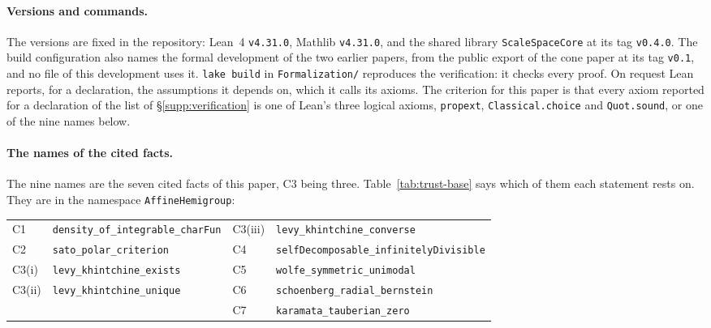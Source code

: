 \paragraph{Versions and commands.} The versions are fixed in the repository: Lean~4
\texttt{v4.31.0}, Mathlib \texttt{v4.31.0}, and the shared library \texttt{ScaleSpaceCore} at its
tag \texttt{v0.4.0}. The build configuration also names the formal development of the two earlier
papers, from the public export of the cone paper at its tag \texttt{v0.1}, and no file of this
development uses it. \texttt{lake build} in \texttt{Formalization/} reproduces the verification:
it checks every proof. On request Lean reports, for a declaration, the assumptions it depends on,
which it calls its axioms. The criterion for this paper is that every axiom reported for a
declaration of the list of \S\ref{supp:verification} is one of Lean's three logical axioms,
\texttt{propext},
\texttt{Classical.choice} and \texttt{Quot.sound}, or one of the nine names below.

\paragraph{The names of the cited facts.} The nine names are the seven cited facts of this
paper, C3 being three. Table~\ref{tab:trust-base} says which of them each statement rests on.
They are in the namespace \texttt{AffineHemigroup}:
\begin{center}
\small
\begin{tabular}{@{}ll@{\qquad}ll@{}}
C1 & \texttt{density\_of\_integrable\_charFun} & C3(iii) & \texttt{levy\_khintchine\_converse} \\
C2 & \texttt{sato\_polar\_criterion} & C4 & \texttt{selfDecomposable\_infinitelyDivisible} \\
C3(i) & \texttt{levy\_khintchine\_exists} & C5 & \texttt{wolfe\_symmetric\_unimodal} \\
C3(ii) & \texttt{levy\_khintchine\_unique} & C6 & \texttt{schoenberg\_radial\_bernstein} \\
 & & C7 & \texttt{karamata\_tauberian\_zero}
\end{tabular}
\end{center}


